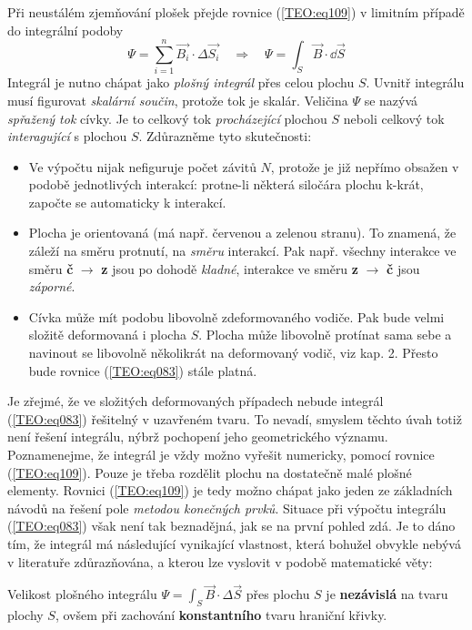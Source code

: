         Při neustálém zjemňování plošek přejde rovnice (\ref{TEO:eq109}) v limitním případě 
        do integrální podoby
        \begin{equation}\label{TEO:eq083}
          \Psi = \sum_{i=1}^n\vec{B_i}\cdot\Delta\vec{S_i} \quad\Longrightarrow\quad
          \Psi = \int_S\vec{B}\cdot \dd{\vec{S}}
        \end{equation}
        Integrál je nutno chápat jako \emph{plošný integrál} přes celou plochu \(S\). Uvnitř 
        integrálu musí figurovat \emph{skalární součin}, protože tok je skalár. Veličina \(\Psi\) 
        se nazývá \emph{spřažený tok} cívky. Je to celkový tok \emph{procházející} plochou \(S\) 
        neboli celkový tok \emph{interagující} s plochou \(S\). Zdůrazněme tyto skutečnosti:
        \begin{itemize}[noitemsep]
          \item Ve výpočtu nijak nefiguruje počet závitů \(N\), protože je již nepřímo obsažen v 
                podobě jednotlivých interakcí: protne-li některá siločára plochu k-krát, započte se 
                automaticky k interakcí.
        
          \item Plocha je orientovaná (má např. červenou a zelenou stranu). To znamená, že záleží 
                na směru protnutí, na \emph{směru} interakcí. Pak např. všechny interakce ve směru 
                \textbf{č} \(\rightarrow\) \textbf{z} jsou po dohodě \emph{kladné}, interakce 
                ve směru \textbf{z} \(\rightarrow\) \textbf{č} jsou \emph{záporné}.
        
          \item Cívka může mít podobu libovolně zdeformovaného vodiče. Pak bude velmi složitě 
                deformovaná i plocha \(S\). Plocha může libovolně protínat sama sebe a navinout se 
                libovolně několikrát na deformovaný vodič, viz kap. 2. Přesto bude rovnice 
                (\ref{TEO:eq083}) stále platná.
      \end{itemize}
      
      Je zřejmé, že ve složitých deformovaných případech nebude integrál (\ref{TEO:eq083}) 
      řešitelný v uzavřeném tvaru. To nevadí, smyslem těchto úvah totiž není řešení integrálu, 
      nýbrž pochopení jeho geometrického významu. Poznamenejme, že integrál je vždy možno vyřešit 
      numericky, pomocí rovnice (\ref{TEO:eq109}). Pouze je třeba rozdělit plochu na 
      dostatečně malé plošné elementy. Rovnici (\ref{TEO:eq109}) je tedy možno chápat jako 
      jeden ze základních návodů na řešení pole \emph{metodou konečných prvků}. Situace při výpočtu 
      integrálu (\ref{TEO:eq083}) však není tak beznadějná, jak se na první pohled zdá. Je 
      to dáno tím, že integrál má následující vynikající vlastnost, která bohužel obvykle nebývá v 
      literatuře zdůrazňována, a kterou lze vyslovit v podobě matematické věty:
      \begin{lemma}\label{es:fig_patocka_lemma01}
        Velikost plošného integrálu \(\Psi = \int_S\vec{B}\cdot\Delta \vec{S}\) přes plochu \(S\) 
        je \textbf{nezávislá} na tvaru plochy \(S\), ovšem při zachování \textbf{konstantního} 
        tvaru hraniční křivky.
      \end{lemma}
      
